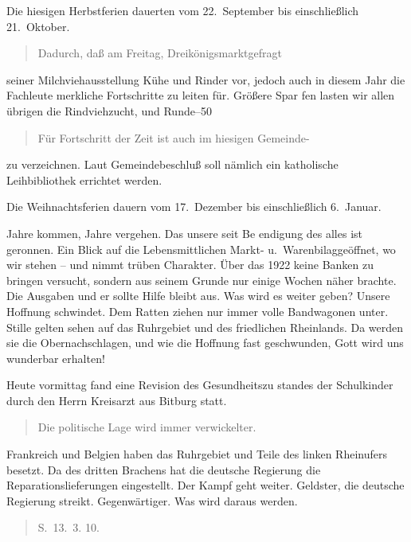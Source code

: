 

Die hiesigen Herbstferien dauerten vom 22.\ September\ob
bis einschließlich 21.\ Oktober.

\pend
\begin{verse}
Dadurch, daß am Freitag, Dreikönigsmarkt\unsicher gefragt
\end{verse}
\pstart
seiner Milchviehausstellung Kühe und Rinder vor, jedoch auch in diesem\ob
Jahr die Fachleute merkliche Fortschritte zu leiten für. Größere Spar\ohb
fen lasten wir allen übrigen die Rindviehzucht, und Runde--50 %

\pend
\begin{verse}
Für Fortschritt der Zeit ist auch im hiesigen Gemeinde-
\end{verse}
\pstart
zu verzeichnen. Laut Gemeindebeschluß soll nämlich ein\ob
katholische Leihbibliothek errichtet werden.

%
Die Weihnachtsferien dauern vom 17.\ Dezember\ob
bis einschließlich 6.\ Januar.

\pend
{}
\pstart

Jahre kommen, Jahre vergehen. Das unsere seit Be\ohb
endigung des alles ist geronnen. Ein Blick auf die\ob
Lebensmittlichen Markt- u.\ Warenbilag\unsicher geöffnet, wo wir\ob
stehen – und nimmt trüben Charakter. Über das 1922 keine\ob
Banken zu bringen versucht, sondern aus seinem Grunde\ob
nur einige Wochen näher brachte. Die Ausgaben und er\ohb
sollte Hilfe bleibt aus. Was wird es weiter geben? Unsere\ob
Hoffnung schwindet. Dem Ratten ziehen nur immer\ob
volle Bandwagonen unter. Stille gelten sehen auf das\ob
Ruhrgebiet und des friedlichen Rheinlands. Da werden\ob
sie die Ober\unsicher nachschlagen, und wie die Hoffnung fast\ob
geschwunden, Gott wird uns wunderbar erhalten!

%
Heute vormittag fand eine Revision des Gesundheitszu\ohb
standes der Schulkinder durch den Herrn Kreisarzt aus\ob
Bitburg statt.

\pend
\begin{verse}
Die politische Lage wird immer verwickelter.
\end{verse}
\pstart
Frankreich und Belgien haben das Ruhrgebiet und Teile\ob
des linken Rheinufers besetzt. Da des dritten Brachens hat die\ob
deutsche Regierung die Reparationslieferungen eingestellt.\ob
Der Kampf geht weiter. Geldster, die deutsche Regierung\ob
streikt. Gegenwärtiger. Was wird daraus werden.

\pend
\begin{verse}
S.\ 13.\ 3. 10.
\end{verse}
\pstart
\pend
